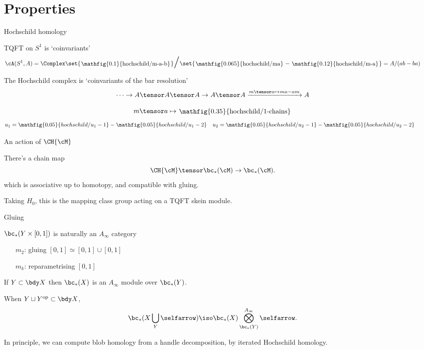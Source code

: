 \documentclass[beamer, compress]{beamer}
\begin{document}
\section{Properties}
\begin{frame}{Hochschild homology}
\begin{block}{TQFT on $S^1$ is `coinvariants'}
\vspace{-3mm}
$$\cA(S^1, A) = \Complex\set{\roundframe{\mathfig{0.1}{hochschild/m-a-b}}}\scalebox{2}{$/$}\set{\roundframe{\mathfig{0.065}{hochschild/ma}} - \roundframe{\mathfig{0.12}{hochschild/m-a}}} = A/(ab-ba)$$
\end{block}
\begin{block}{}
The Hochschild complex is `coinvariants of the bar resolution'
\vspace{-2mm}
$$ \cdots \to A \tensor A \tensor A \to A \tensor A \xrightarrow{m \tensor a \mapsto ma-am} A$$
\end{block}
\begin{thm}[$ \HC_*(A) \iso \bc_*(S^1; A)$]
$$m \tensor a \mapsto
\roundframe{\mathfig{0.35}{hochschild/1-chains}}
$$
\vspace{-5mm}
\begin{align*}
u_1 & = \mathfig{0.05}{hochschild/u_1-1} - \mathfig{0.05}{hochschild/u_1-2} & u_2  &= \mathfig{0.05}{hochschild/u_2-1} - \mathfig{0.05}{hochschild/u_2-2} 
\end{align*}
\end{thm}
\end{frame}

\begin{frame}{An action of $\CH{\cM}$}
\begin{thm}
There's a chain map
$$\CH{\cM} \tensor \bc_*(\cM) \to \bc_*(\cM).$$
which is associative up to homotopy, and compatible with gluing.
\end{thm}
\begin{block}{}
Taking $H_0$, this is the mapping class group acting on a TQFT skein module.
\end{block}
\end{frame}

\begin{frame}{Gluing}
\begin{block}{$\bc_*(Y \times [0,1])$ is naturally an $A_\infty$ category}
\begin{itemize}
\item[$m_2$:] gluing $[0,1] \simeq [0,1] \cup [0,1]$
\item[$m_k$:] reparametrising $[0,1]$
\end{itemize}
\end{block}
\begin{block}{}
If $Y \subset \bdy X$ then $\bc_*(X)$ is an $A_\infty$ module over $\bc_*(Y)$.
\end{block}
\begin{thm}
When $Y \sqcup Y^{\text{op}} \subset \bdy X$,
\vspace{-5mm}
\[
	\bc_*(X \bigcup_Y \selfarrow) \iso \bc_*(X) \bigotimes_{\bc_*(Y)}^{A_\infty} \selfarrow.
\]
\end{thm}
In principle, we can compute blob homology from a handle decomposition, by iterated Hochschild homology.
\end{frame}
\end{document}
